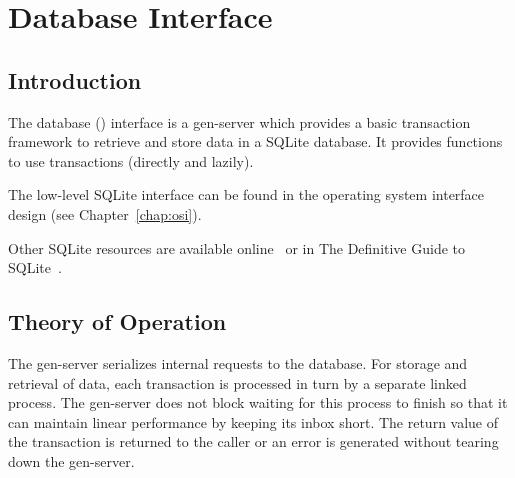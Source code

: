 %
%
%

\chapter {Database Interface}\label{chap:db}

\section {Introduction}

The database () interface is a gen-server which provides a
basic transaction framework to retrieve and store data in a SQLite
database. It provides functions to use transactions (directly and
lazily).

The low-level SQLite interface can be found in the operating system
interface design (see Chapter~\ref{chap:osi}).

Other SQLite resources are available online~\cite{sqlite} or in The
Definitive Guide to SQLite~\cite{sqlite-guide}.

\section {Theory of Operation}

The  gen-server serializes internal requests to the
database.  For storage and retrieval of data, each transaction is
processed in turn by a separate linked  process.  The gen-server does
not block waiting for this process to finish so that it can maintain
linear performance by keeping its inbox short. The return value of the
transaction is returned to the caller or an error is generated without
tearing down the gen-server.

